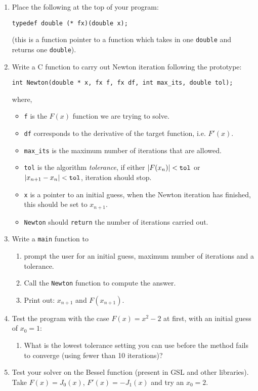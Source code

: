 \documentclass[a4paper,12pt]{article}
\begin{document}
\begin{enumerate}
\item Place the following at the top of your program:
\begin{center}
\tt typedef double (* fx)(double x);
\end{center}
(this is a function pointer to a function which takes in one {\tt double} and returns one {\tt double}).
\item Write a C function to carry out Newton iteration following the prototype:
\begin{center}
\tt int Newton(double * x, fx f, fx df, int max\_its, double tol);
\end{center}
where,
\begin{itemize}
\item {\tt f} is the $F(x)$ function we are trying to solve.
\item {\tt df} corresponds to the derivative of the target function, i.e. $F'(x)$.
\item {\tt max\_its} is the maximum number of iterations that are allowed.
\item {\tt tol} is the algorithm \emph{tolerance}, if either $|F(x_n)| < \mathrm{\tt tol}$ or $|x_{n+1}-x_n| < \mathrm{\tt tol}$, iteration should stop.
\item {\tt x} is a pointer to an initial guess, when the Newton iteration has finished, this should be set to $x_{n+1}$.
\item {\tt Newton} should {\tt return} the number of iterations carried out. \end{itemize}
\item Write a {\tt main} function to
\begin{enumerate}
\item prompt the user for an initial guess, maximum number of iterations and a tolerance.
\item Call the {\tt Newton} function to compute the answer.
\item Print out: $x_{n+1}$ and $F(x_{n+1})$.
\end{enumerate}
\item Test the program with the case $F(x) = x^2-2$ at first, with an initial guess of $x_0=1$:
\begin{enumerate}
\item What is the lowest tolerance setting you can use before the method fails to converge (using fewer than 10 iterations)?
\end{enumerate}
\item Test your solver on the Bessel function (present in GSL and other libraries). Take $F(x) = J_0(x)$, $F'(x) = -J_1(x)$ and try an $x_0 = 2$.
\end{enumerate}
\end{document}
